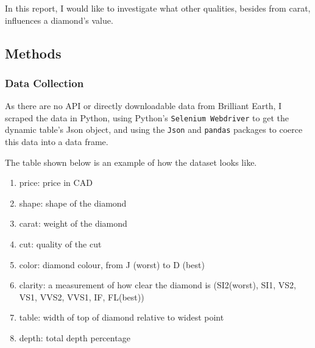 \documentclass[
]{article}
\providecommand{\tightlist}{%
  \setlength{\itemsep}{0pt}\setlength{\parskip}{0pt}}
\begin{document}
In this report, I would like to investigate what other qualities,
besides from carat, influences a diamond's value.

\hypertarget{methods}{%
\subsection{Methods}\label{methods}}

\hypertarget{data-collection}{%
\subsubsection{Data Collection}\label{data-collection}}

As there are no API or directly downloadable data from Brilliant Earth,
I scraped the data in Python, using Python's
\texttt{Selenium\ Webdriver} to get the dynamic table's Json object, and
using the \texttt{Json} and \texttt{pandas} packages to coerce this data
into a data frame.

The table shown below is an example of how the dataset looks like.

\begin{table}[H]

\caption{\label{tab:unnamed-chunk-1}Diamond Table (Pre-cleaning)}
\centering
{}
\end{table}

\begin{enumerate}
\def\labelenumi{\arabic{enumi}.}
\tightlist
\item
  price: price in CAD
\item
  shape: shape of the diamond
\item
  carat: weight of the diamond
\item
  cut: quality of the cut
\item
  color: diamond colour, from J (worst) to D (best)
\item
  clarity: a measurement of how clear the diamond is (SI2(worst), SI1,
  VS2, VS1, VVS2, VVS1, IF, FL(best))
\item
  table: width of top of diamond relative to widest point
\item
  depth: total depth percentage
\end{enumerate}
\end{document}
